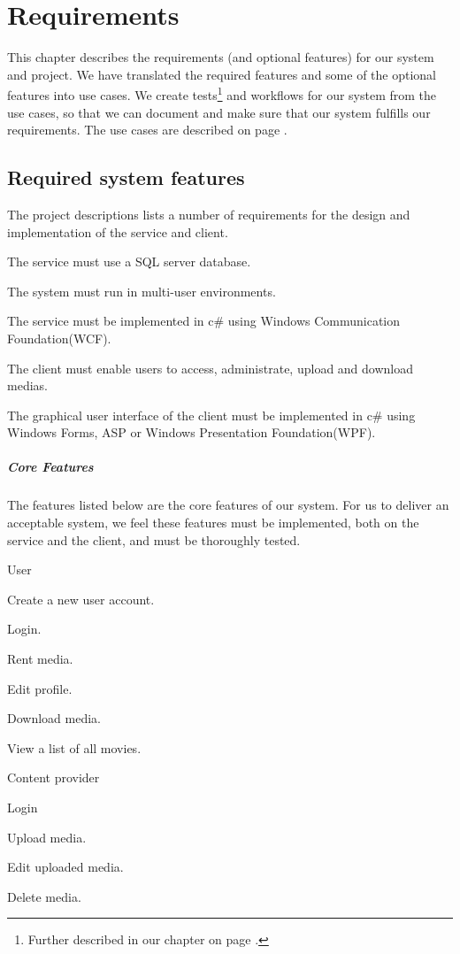\chapter{Requirements}
\label{Requirements}
This chapter describes the requirements (and optional features) for our system and project. We have translated the required features and some of the optional features into use cases. We create tests\footnote{Further described in our  chapter on page \pageref{Testing}.} and workflows for our system from the use cases, so that we can document and make sure that our system fulfills our requirements. The use cases are described on page \pageref{Requirements_UC}.

\section{Required system features}
\label{Requirements_Rfeatures}
The project descriptions lists a number of requirements for the design and implementation of the service and client.
\begin{my_itemize}
\item The service must use a SQL server database.
\item The system must run in multi-user environments.
\item The service must be implemented in c\# using Windows Communication Foundation(WCF).
\item The client must enable users to access, administrate, upload and download medias.
\item The graphical user interface of the client must be implemented in c\# using Windows Forms, ASP or Windows Presentation Foundation(WPF).
\end{my_itemize}

\paragraph{Core Features}
The features listed below are the core features of our system. For us to deliver an acceptable system, we feel these features must be implemented, both on the service and the client, and must be thoroughly tested. 
\begin{my_itemize}
	\item User
	\begin{my_itemize}
		\item Create a new user account.
		\item Login.
		\item Rent media.
		\item Edit profile.
		\item Download media.
		\item View a list of all movies.
	\end{my_itemize}
	\item Content provider
	\begin{my_itemize}
		\item Login
		\item Upload media.
		\item Edit uploaded media.
		\item Delete media.
	\end{my_itemize}
\end{my_itemize}

